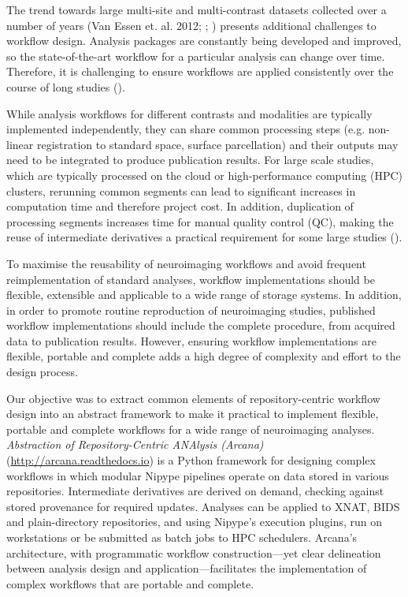 The trend towards large multi-site and multi-contrast datasets collected
over a number of years (Van Essen et. al. 2012; \cite{thompson_enigma_2014};
\cite{sudlow_uk_2015}) presents additional challenges to workflow design.
Analysis packages are constantly being developed and improved, so the
state-of-the-art workflow for a particular analysis can change over
time. Therefore, it is challenging to ensure workflows are applied
consistently over the course of long studies (\cite{cusack_automatic_2015}).

While analysis workflows for different contrasts and modalities are
typically implemented independently, they can share common processing
steps (e.g. non-linear registration to standard space, surface
parcellation) and their outputs may need to be integrated to produce
publication results. For large scale studies, which are typically
processed on the cloud or high-performance computing (HPC) clusters,
rerunning common segments can lead to significant increases in
computation time and therefore project cost. In addition, duplication of
processing segments increases time for manual quality control (QC),
making the reuse of intermediate derivatives a practical requirement for
some large studies (\cite{schreiber_using_2018}).

To maximise the reusability of neuroimaging workflows and avoid frequent
reimplementation of standard analyses, workflow implementations should
be flexible, extensible and applicable to a wide range of storage
systems. In addition, in order to promote routine reproduction of
neuroimaging studies, published workflow implementations should include
the complete procedure, from acquired data to publication results.
However, ensuring workflow implementations are flexible, portable and
complete adds a high degree of complexity and effort to the design
process.

Our objective was to extract common elements of repository-centric
workflow design into an abstract framework to make it practical to
implement flexible, portable and complete workflows for a wide range of
neuroimaging analyses. \emph{Abstraction of Repository-Centric ANAlysis
(Arcana)} \\(\href{http://arcana.readthedocs.io}{http://arcana.readthedocs.io}) is a Python framework for
designing complex workflows in which modular Nipype pipelines operate on
data stored in various repositories. Intermediate derivatives are
derived on demand, checking against stored provenance for required
updates. Analyses can be applied to XNAT, BIDS and plain-directory
repositories, and using Nipype's execution plugins, run on workstations
or be submitted as batch jobs to HPC schedulers. Arcana's architecture,
with programmatic workflow construction---yet clear delineation between
analysis design and application---facilitates the implementation of
complex workflows that are portable and complete.

